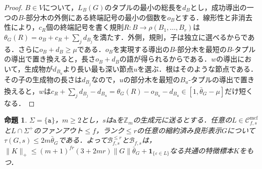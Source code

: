 \documentclass[11pt,a4paper]{ltjsarticle}
\numberwithin{equation}{section}
\theoremstyle{plain}
\newtheorem{proposition}[theorem]{命題}
\theoremstyle{definition}
\theoremstyle{remark}
\newcommand{\Cmcf}[2]{\mathcal{C}^{\mathrm{mcf}}_{#1,#2}}
\newcommand{\eps}{\varepsilon}
\begin{document}
\begin{proof}
$B\in V$について，$L_B(G)$のタプルの最小の総長を$d_B$とし，成功導出の一つの$B$-部分木の外側にある終端記号の最小の個数を$o_B$とする．線形性と非消去性により，$c_R$個の終端記号を書く規則$R:B\to\rho(B_1,\ldots,B_r)$は$\theta_G(R)=o_B+c_R+\sum_jd_{B_j}$を満たす．外側，規則，子は独立に選べるからである．さらに$o_B+d_B\ge\mu$である．$o_B$を実現する導出の$B$-部分木を最短の$B$-タプルの導出で置き換えると，長さ$o_B+d_B$の語が得られるからである．$w$の導出において，生成物が$d_{B_u}$より長い最も深い節点$u$を選ぶ．根はそのような節点である．その子の生成物の長さは$d_{B_j}$なので，$u$の部分木を最短の$B_u$-タプルの導出で置き換えると，$w$は$c_R+\sum_jd_{B_j}-d_{B_u}=\theta_G(R)-o_{B_u}-d_{B_u}\in[1,\bar\theta_G-\mu]$だけ短くなる．
\end{proof}

\begin{proposition}\label{prop:unary-cyclic-linear}
$\Sigma=\{\mathtt a\}$，$m\ge2$とし，$s$は$\mathtt a$を$\mathbb Z_m$の生成元に送るとする．任意の$L\in\Cmcf{f}{s}$と$L\cap\Sigma^+$のファンアウト$\le f$，ランク$\le r$の任意の縮約済み良形表示$G$について$\tau(G,s)\le2m\bar\theta_G$である．よって$\mathcal B^{\le r}_{f,s}$と$\mathcal B_{f,s}$は，$\|K\|_+\le(m+1)^{fr}(3+2mr)\|G\|\bar\theta_G+\mathbf 1_{\{\eps\in L\}}$なる共通の特徴標本$K$をもつ．
\end{proposition}
\end{document}
